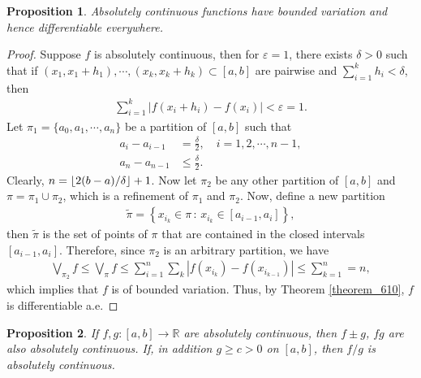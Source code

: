 \documentclass[11pt]{book}
\DeclarePairedDelimiter\floor{\lfloor}{\rfloor}
\newtheorem{proposition}{Proposition}[chapter]
\theoremstyle{definition}
\numberwithin{equation}{chapter}
\begin{document}
\begin{proposition}\label{prop_63}
Absolutely continuous functions have bounded variation and hence differentiable everywhere.
\end{proposition}
\begin{proof}
Suppose $f$ is absolutely continuous, then for $\varepsilon = 1$, there exists $\delta > 0$ such that if $(x_1,x_1+h_1), \cdots, (x_k,x_k+h_k) \subset [a,b]$ are pairwise and $\sum^k_{i=1} h_i < \delta$, then 
\begin{align*}
    \sum^k_{i=1} \left|f(x_i+h_i) - f(x_i)\right| < \varepsilon = 1.
\end{align*}
Let $\pi_1 = \{a_0, a_1, \cdots, a_n\}$ be a partition of $[a,b]$ such that 
\begin{align*}
    a_i - a_{i-1} & = \frac{\delta}{2}, \quad i = 1,2,\cdots,n - 1, \\
    a_n - a_{n-1} & \leq \frac{\delta}{2}.
\end{align*}
Clearly, $n = \floor*{2(b-a)/\delta} + 1$. Now let $\pi_2$ be any other partition of $[a,b]$ and $\pi = \pi_1 \cup \pi_2$, which is a refinement of $\pi_1$ and $\pi_2$. Now, define a new partition
\begin{align*}
    \widetilde{\pi} = \left\{x_{i_k} \in \pi \,:\, x_{i_k} \in [a_{i-1},a_i]\right\},
\end{align*}
then $\widetilde{\pi}$ is the set of points of $\pi$ that are contained in the closed intervals $[a_{i-1},a_i]$. Therefore, since $\pi_2$ is an arbitrary partition, we have
\begin{align*}
    \bigvee_{\pi_2} f \leq \bigvee_{\pi} f \leq \sum^n_{i=1} \sum_k \left|f(x_{i_k}) - f(x_{i_{k-1}})\right| \leq \sum^n_{k=1} = n,
\end{align*}
which implies that $f$ is of bounded variation. Thus, by Theorem \ref{theorem_610}, $f$ is differentiable a.e.
\end{proof}

\medskip

\begin{proposition}
If $f,g: [a,b] \to \mathbb{R}$ are absolutely continuous, then $f \pm g$, $fg$ are also absolutely continuous. If, in addition $g \geq c > 0$ on $[a,b]$, then $f/g$ is absolutely continuous.
\end{proposition}

\medskip
\end{document}
